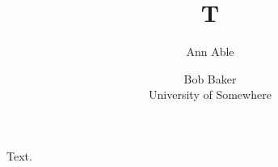 \documentclass{llncs}
\begin{document}
\title{T}
\author{Ann Able \and Bob Baker\\ University of Somewhere}
\maketitle
Text.
\end{document}
